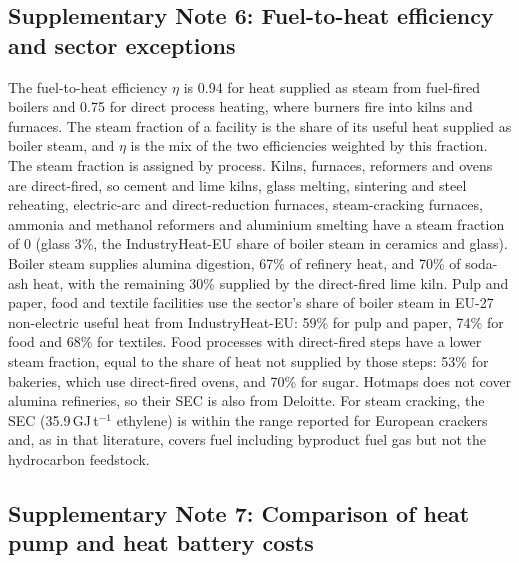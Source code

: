 \documentclass[11pt]{article}
\begin{document}
\subsection*{Supplementary Note 6: Fuel-to-heat efficiency and sector exceptions}
The fuel-to-heat efficiency $\eta$ is 0.94 for heat supplied as steam from fuel-fired boilers and 0.75 for direct process heating, where burners fire into kilns and furnaces\cite{saad2026}. The steam fraction of a facility is the share of its useful heat supplied as boiler steam, and $\eta$ is the mix of the two efficiencies weighted by this fraction. The steam fraction is assigned by process. Kilns, furnaces, reformers and ovens are direct-fired, so cement and lime kilns, glass melting, sintering and steel reheating, electric-arc and direct-reduction furnaces, steam-cracking furnaces, ammonia and methanol reformers and aluminium smelting have a steam fraction of 0 (glass 3\%, the IndustryHeat-EU share of boiler steam in ceramics and glass\cite{industryheateu2025}). Boiler steam supplies alumina digestion, 67\% of refinery heat\cite{deloitte2022alumina}, and 70\% of soda-ash heat, with the remaining 30\% supplied by the direct-fired lime kiln. Pulp and paper, food and textile facilities use the sector's share of boiler steam in EU-27 non-electric useful heat from IndustryHeat-EU\cite{industryheateu2025}: 59\% for pulp and paper, 74\% for food and 68\% for textiles. Food processes with direct-fired steps have a lower steam fraction, equal to the share of heat not supplied by those steps: 53\% for bakeries, which use direct-fired ovens, and 70\% for sugar. Hotmaps does not cover alumina refineries, so their SEC is also from Deloitte\cite{deloitte2022alumina}. For steam cracking, the SEC (35.9\,GJ\,t$^{-1}$ ethylene) is within the range reported for European crackers and, as in that literature, covers fuel including byproduct fuel gas but not the hydrocarbon feedstock\cite{ren2006}.

\subsection*{Supplementary Note 7: Comparison of heat pump and heat battery costs}
\end{document}
